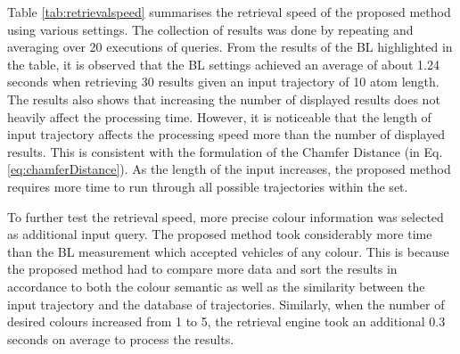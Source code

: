 Table \ref{tab:retrievalspeed} summarises the retrieval speed of the proposed method using various settings. The collection of results was done by repeating and averaging over 20 executions of queries. From the results of the BL highlighted in the table, it is observed that the BL settings achieved an average of about 1.24 seconds when retrieving 30 results given an input trajectory of 10 atom length. The results also shows that increasing the number of displayed results does not heavily affect the processing time. However, it is noticeable that the length of input trajectory affects the processing speed more than the number of displayed results. This is consistent with the formulation of the Chamfer Distance (in Eq. \ref{eq:chamferDistance}). As the length of the input increases, the proposed method requires more time to run through all possible trajectories within the set.

To further test the retrieval speed, more precise colour information was selected as additional input query. The proposed method took considerably more time than the BL measurement which accepted vehicles of any colour. This is because the proposed method had to compare more data and sort the results in accordance to both the colour semantic as well as the similarity between the input trajectory and the database of trajectories. Similarly, when the number of desired colours increased from 1 to 5, the retrieval engine took an additional 0.3 seconds on average to process the results.


